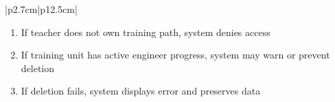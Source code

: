\begin{table}[H]
\begin{tabular}{|p{2.7cm}|p{12.5cm}|}
\begin{minipage}[t]{\linewidth}
                                      \begin{enumerate}[topsep=0pt,itemsep=1pt,parsep=0pt,partopsep=0pt]
                                          \item If teacher does not own training path, system denies access
                                          \item If training unit has active engineer progress, system may warn or prevent deletion
                                          \item If deletion fails, system displays error and preserves data
                                      \end{enumerate}
                                  \end{minipage} \\
        \hline
    \end{tabular}
    \label{tab:teacher-delete-unit}
\end{table}
